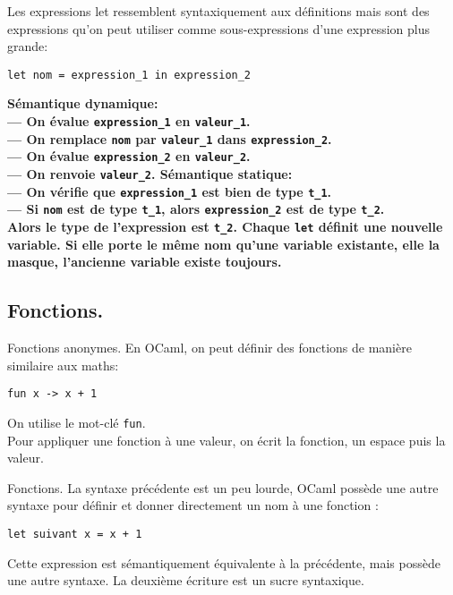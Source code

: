 \documentclass[french, 11pt]{article}
\begin{document}
\begin{defi}{}{}
    Les expressions let ressemblent syntaxiquement aux définitions mais sont des expressions qu'on peut utiliser comme sous-expressions d'une expression plus grande:
    \begin{center}
        \texttt{let nom = expression\_1 in expression\_2}
    \end{center}
    \bf{Sémantique dynamique:}\\
    --- On évalue \texttt{expression\_1} en \texttt{valeur\_1}.\\
    --- On remplace \texttt{nom} par \texttt{valeur\_1} dans \texttt{expression\_2}.\\
    --- On évalue \texttt{expression\_2} en \texttt{valeur\_2}.\\
    --- On renvoie \texttt{valeur\_2}.\n
    \bf{Sémantique statique:}\\
    --- On vérifie que \texttt{expression\_1} est bien de type \texttt{t\_1}.\\
    --- Si \texttt{nom} est de type \texttt{t\_1}, alors \texttt{expression\_2} est de type \texttt{t\_2}.\\
    Alors le type de l'expression est \texttt{t\_2}.\n
    Chaque \texttt{let} définit une nouvelle variable. Si elle porte le même nom qu'une variable existante, elle la masque, l'ancienne variable existe toujours.
\end{defi}

\subsection{Fonctions.}

\begin{defi}{Fonctions anonymes.}{}
    En OCaml, on peut définir des fonctions de manière similaire aux maths:
    \begin{center}
        \texttt{fun x -> x + 1}
    \end{center}
    On utilise le mot-clé \texttt{fun}.\\
    Pour appliquer une fonction à une valeur, on écrit la fonction, un espace puis la valeur.
\end{defi}

\begin{defi}{Fonctions.}{}
    La syntaxe précédente est un peu lourde, OCaml possède une autre syntaxe pour définir et donner directement un nom à une fonction :
    \begin{center}
        \texttt{let suivant x = x + 1}
    \end{center}
    Cette expression est sémantiquement équivalente à la précédente, mais possède une autre syntaxe. La deuxième écriture est un sucre syntaxique.
\end{defi}
\end{document}
